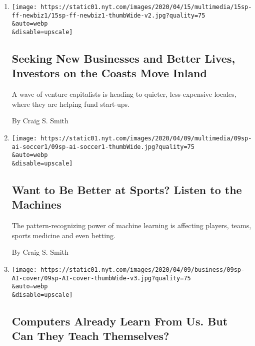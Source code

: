 \begin{enumerate}
\def\labelenumi{\arabic{enumi}.}
\item
  \href{/2020/04/15/business/smallbusiness/venture-capital-move-inland.html}{}

  \texttt{[image: https://static01.nyt.com/images/2020/04/15/multimedia/15sp-ff-newbiz1/15sp-ff-newbiz1-thumbWide-v2.jpg?quality=75\\\&auto=webp\\\&disable=upscale]}

  \hypertarget{seeking-new-businesses-and-better-lives-investors-on-the-coasts-move-inland}{%
  \subsection{Seeking New Businesses and Better Lives, Investors on the
  Coasts Move
  Inland}\label{seeking-new-businesses-and-better-lives-investors-on-the-coasts-move-inland}}

  A wave of venture capitalists is heading to quieter, less-expensive
  locales, where they are helping fund start-ups.

  By Craig S. Smith
\item
  \href{/2020/04/08/technology/ai-sports-athletes-machine-learning.html}{}

  \texttt{[image: https://static01.nyt.com/images/2020/04/09/multimedia/09sp-ai-soccer1/09sp-ai-soccer1-thumbWide.jpg?quality=75\\\&auto=webp\\\&disable=upscale]}

  \hypertarget{want-to-be-better-at-sports-listen-to-the-machines}{%
  \subsection{Want to Be Better at Sports? Listen to the
  Machines}\label{want-to-be-better-at-sports-listen-to-the-machines}}

  The pattern-recognizing power of machine learning is affecting
  players, teams, sports medicine and even betting.

  By Craig S. Smith
\item
  \href{/2020/04/08/technology/ai-computers-learning-supervised-unsupervised.html}{}

  \texttt{[image: https://static01.nyt.com/images/2020/04/09/business/09sp-AI-cover/09sp-AI-cover-thumbWide-v3.jpg?quality=75\\\&auto=webp\\\&disable=upscale]}

  \hypertarget{computers-already-learn-from-us-but-can-they-teach-themselves}{%
  \subsection{Computers Already Learn From Us. But Can They Teach
  Themselves?}\label{computers-already-learn-from-us-but-can-they-teach-themselves}}


\end{enumerate}
